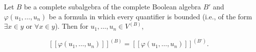 Let $B$ be a complete subalgebra of the complete Boolean algebra $B'$ and $\varphi(u_1, \ldots, u_n)$ be a formula in which every quantifier is bounded (i.e., of the form $\exists x \in y$ or $\forall x \in y$). Then for $u_1, \ldots, u_n \in V^{(B)}$,

$$[\![\varphi(u_1, \ldots, u_n)]\!]^{(B)} = [\![\varphi(u_1, \ldots, u_n)]\!]^{(B')}.$$
